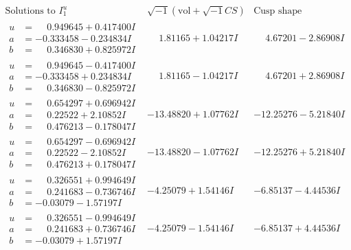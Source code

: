 \documentclass[1p]{elsarticle_modified}
\theoremstyle{definition}
\newcommand{\I}{\sqrt{-1}}
\begin{document}
$$\begin{array}{c|c|c}  
\text{Solutions to }I^u_{1}& \I (\text{vol} + \sqrt{-1}CS) & \text{Cusp shape}\\
 \hline 
\begin{aligned}
u &= \phantom{-}0.949645 + 0.417400 I \\
a &= -0.333458 - 0.234834 I \\
b &= \phantom{-}0.346830 + 0.825972 I\end{aligned}
 & \phantom{-}1.81165 + 1.04217 I & \phantom{-}4.67201 - 2.86908 I \\ \hline\begin{aligned}
u &= \phantom{-}0.949645 - 0.417400 I \\
a &= -0.333458 + 0.234834 I \\
b &= \phantom{-}0.346830 - 0.825972 I\end{aligned}
 & \phantom{-}1.81165 - 1.04217 I & \phantom{-}4.67201 + 2.86908 I \\ \hline\begin{aligned}
u &= \phantom{-}0.654297 + 0.696942 I \\
a &= \phantom{-}0.22522 + 2.10852 I \\
b &= \phantom{-}0.476213 - 0.178047 I\end{aligned}
 & -13.48820 + 1.07762 I & -12.25276 - 5.21840 I \\ \hline\begin{aligned}
u &= \phantom{-}0.654297 - 0.696942 I \\
a &= \phantom{-}0.22522 - 2.10852 I \\
b &= \phantom{-}0.476213 + 0.178047 I\end{aligned}
 & -13.48820 - 1.07762 I & -12.25276 + 5.21840 I \\ \hline\begin{aligned}
u &= \phantom{-}0.326551 + 0.994649 I \\
a &= \phantom{-}0.241683 - 0.736746 I \\
b &= -0.03079 - 1.57197 I\end{aligned}
 & -4.25079 + 1.54146 I & -6.85137 - 4.44536 I \\ \hline\begin{aligned}
u &= \phantom{-}0.326551 - 0.994649 I \\
a &= \phantom{-}0.241683 + 0.736746 I \\
b &= -0.03079 + 1.57197 I\end{aligned}
 & -4.25079 - 1.54146 I & -6.85137 + 4.44536 I \\ \hline\begin{aligned}

\end{aligned}
\end{array}$$
\end{document}
